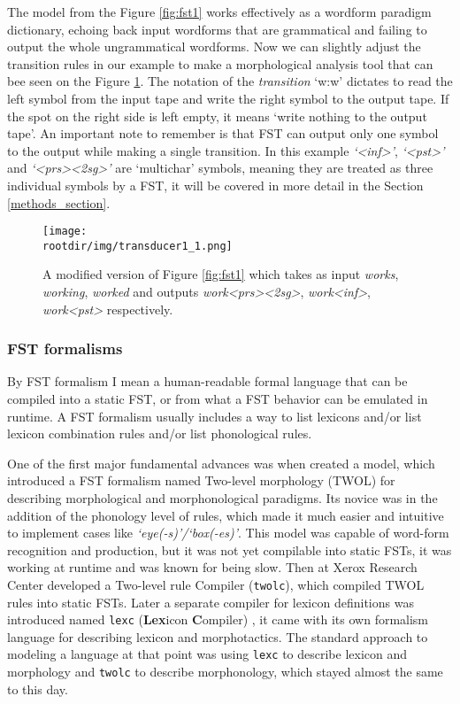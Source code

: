 The model from the Figure \ref{fig:fst1} works effectively as a wordform paradigm dictionary, echoing back input wordforms that are grammatical and failing to output the whole ungrammatical wordforms. Now we can slightly adjust the transition rules in our example to make a morphological analysis tool that can bee seen on the Figure \ref{fig:fst1_1}. The notation of the \textit{transition} `w:w' dictates to read the left symbol from the input tape and write the right symbol to the output tape. If the spot on the right side is left empty, it means `write nothing to the output tape'. An important note to remember is that FST can output only one symbol to the output while making a single transition. In this example \textit{`<inf>'}, \textit{`<pst>'} and \textit{`<prs><2sg>'} are `multichar' symbols, meaning they are treated as three individual symbols by a FST, it will be covered in more detail in the Section \ref{methods_section}.

\begin{figure}[!h]
    \centering
    \texttt{[image: \\rootdir/img/transducer1\_1.png]}
    \caption{A modified version of Figure \ref{fig:fst1} which takes as input \textit{works}, \textit{working}, \textit{worked} and outputs \textit{work<prs><2sg>}, \textit{work<inf>}, \textit{work<pst>} respectively.}
    \label{fig:fst1_1}
\end{figure}

\subsubsection{FST formalisms}
By FST formalism I mean a human-readable formal language that can be compiled into a static FST, or from what a FST behavior can be emulated in runtime. A FST formalism usually includes a way to list lexicons and/or list lexicon combination rules and/or list phonological rules.

One of the first major fundamental advances was when \parencite{koskenniemi_twol_1983} created a model, which introduced a FST formalism named Two-level morphology (TWOL) for describing morphological and morphonological paradigms. Its novice was in the addition of the phonology level of rules, which made it much easier and intuitive to implement cases like \textit{`eye(-s)'/`box(-es)'}. This model was capable of word-form recognition and production, but it was not yet compilable into static FSTs, it was working at runtime and was known for being slow. Then \textcite{karttunen_twolc_1987} at Xerox Research Center developed a Two-level rule Compiler (\texttt{twolc}), which compiled TWOL rules into static FSTs. Later a separate compiler for lexicon definitions was introduced named \texttt{lexc} (\textbf{Lex}icon \textbf{C}ompiler) \parencite{karttunen_lexc_1993}, it came with its own formalism language for describing lexicon and morphotactics. The standard approach to modeling a language at that point was using \texttt{lexc} to describe lexicon and morphology and \texttt{twolc} to describe morphonology, which stayed almost the same to this day. 

